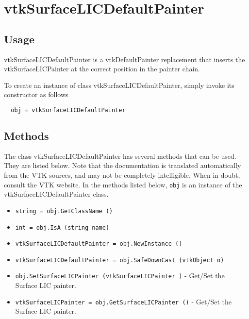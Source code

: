 \section{vtkSurfaceLICDefaultPainter}

\subsection{Usage}

  vtkSurfaceLICDefaultPainter is a vtkDefaultPainter replacement
  that inserts the vtkSurfaceLICPainter at the correct position in the painter
  chain.


To create an instance of class vtkSurfaceLICDefaultPainter, simply
invoke its constructor as follows
\begin{verbatim}
  obj = vtkSurfaceLICDefaultPainter
\end{verbatim}
\subsection{Methods}

The class vtkSurfaceLICDefaultPainter has several methods that can be used.
  They are listed below.
Note that the documentation is translated automatically from the VTK sources,
and may not be completely intelligible.  When in doubt, consult the VTK website.
In the methods listed below, \verb|obj| is an instance of the vtkSurfaceLICDefaultPainter class.
\begin{itemize}
\item  \verb|string = obj.GetClassName ()|

\item  \verb|int = obj.IsA (string name)|

\item  \verb|vtkSurfaceLICDefaultPainter = obj.NewInstance ()|

\item  \verb|vtkSurfaceLICDefaultPainter = obj.SafeDownCast (vtkObject o)|

\item  \verb|obj.SetSurfaceLICPainter (vtkSurfaceLICPainter )| -  Get/Set the Surface LIC painter.

\item  \verb|vtkSurfaceLICPainter = obj.GetSurfaceLICPainter ()| -  Get/Set the Surface LIC painter.

\end{itemize}
